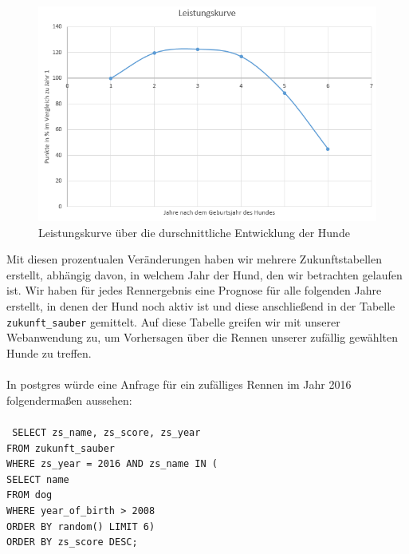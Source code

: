 \documentclass[10pt,a4paper]{article}
\begin{document}
		\begin{figure}[h]
			\centering
			\includegraphics[width=1\linewidth]{leistungskurve}
			\caption{Leistungskurve über die durschnittliche Entwicklung der Hunde}
			\label{fig:leistungskurve}
		\end{figure}
		Mit diesen prozentualen Veränderungen haben wir mehrere Zukunftstabellen erstellt, abhängig davon, in welchem Jahr der Hund, den wir betrachten gelaufen ist. Wir haben für jedes Rennergebnis eine Prognose für alle folgenden Jahre erstellt, in denen der Hund noch aktiv ist und diese anschließend in der Tabelle \texttt{zukunft\_sauber} gemittelt. Auf diese Tabelle greifen wir mit unserer Webanwendung zu, um Vorhersagen über die Rennen unserer zufällig gewählten Hunde zu treffen.\\
		\\
		In postgres würde eine Anfrage für ein zufälliges Rennen im Jahr 2016 folgendermaßen aussehen:\\
		\\
		\texttt{
			SELECT zs\_name, zs\_score, zs\_year\\
			\hspace*{2mm}	FROM zukunft\_sauber\\
			\hspace*{2mm}	WHERE zs\_year = 2016 AND zs\_name IN (\\
			\hspace*{4mm}	SELECT name \\
			\hspace*{6mm}	FROM dog \\
			\hspace*{6mm}	WHERE year\_of\_birth > 2008 \\
			\hspace*{6mm}	ORDER BY random() LIMIT 6)\\
			\hspace*{2mm}	ORDER BY zs\_score DESC;\\
			}
\end{document}
